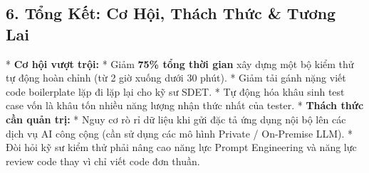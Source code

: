 \subsection{6. Tổng Kết: Cơ Hội, Thách Thức \& Tương Lai}

* \textbf{Cơ hội vượt trội:}
  * Giảm \textbf{75\% tổng thời gian} xây dựng một bộ kiểm thử tự động hoàn chỉnh (từ 2 giờ xuống dưới 30 phút).
  * Giảm tải gánh nặng viết code boilerplate lặp đi lặp lại cho kỹ sư SDET.
  * Tự động hóa khâu sinh test case vốn là khâu tốn nhiều năng lượng nhận thức nhất của tester.
* \textbf{Thách thức cần quản trị:}
  * Nguy cơ rò rỉ dữ liệu khi gửi đặc tả ứng dụng nội bộ lên các dịch vụ AI công cộng (cần sử dụng các mô hình Private / On-Premise LLM).
  * Đòi hỏi kỹ sư kiểm thử phải nâng cao năng lực Prompt Engineering và năng lực review code thay vì chỉ viết code đơn thuần.

